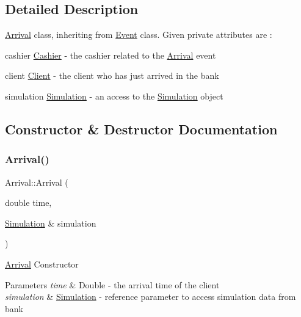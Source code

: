\subsection{Detailed Description}
\hyperlink{classArrival}{Arrival} class, inheriting from \hyperlink{classEvent}{Event} class. Given private attributes are \+:
\begin{DoxyItemize}
\item cashier \hyperlink{classCashier}{Cashier} -\/ the cashier related to the \hyperlink{classArrival}{Arrival} event
\item client \hyperlink{classClient}{Client} -\/ the client who has just arrived in the bank
\item simulation \hyperlink{classSimulation}{Simulation} -\/ an access to the \hyperlink{classSimulation}{Simulation} object 
\end{DoxyItemize}

\subsection{Constructor \& Destructor Documentation}
\mbox{\label{classArrival_a996941f87624cdbe25ffdaf87672a34f}} 
\subsubsection{\texorpdfstring{Arrival()}{Arrival()}\hspace{0.1cm}{\footnotesize\ttfamily [1/2]}}
{\footnotesize\ttfamily Arrival\+::\+Arrival (\begin{DoxyParamCaption}\item[{double}]{time,  }\item[{\hyperlink{classSimulation}{Simulation} \&}]{simulation }\end{DoxyParamCaption})}

\hyperlink{classArrival}{Arrival} Constructor 
\begin{DoxyParams}{Parameters}
{\em time} & Double -\/ the arrival time of the client \\
\hline
{\em simulation} & \hyperlink{classSimulation}{Simulation} -\/ reference parameter to access simulation data from bank \\
\hline
\end{DoxyParams}
\mbox{\label{classArrival_a4c92db3a71a26cd86c33323faee828f7}} 
